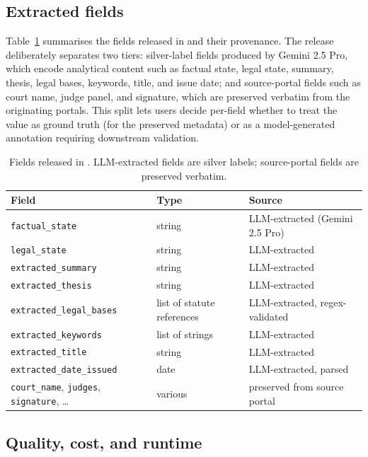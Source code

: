 \subsection{Extracted fields}
\label{sec:pipeline:fields}

Table~\ref{tab:fields} summarises the fields released in \juddgespl{} and their provenance. The release deliberately separates two tiers: silver-label fields produced by Gemini 2.5 Pro, which encode analytical content such as factual state, legal state, summary, thesis, legal bases, keywords, title, and issue date; and source-portal fields such as court name, judge panel, and signature, which are preserved verbatim from the originating portals. This split lets users decide per-field whether to treat the value as ground truth (for the preserved metadata) or as a model-generated annotation requiring downstream validation.

\begin{table}[h]
\centering
\small
\begin{tabular}{lll}
\toprule
\textbf{Field} & \textbf{Type} & \textbf{Source} \\
\midrule
\texttt{factual\_state} & string & LLM-extracted (Gemini 2.5 Pro) \\
\texttt{legal\_state} & string & LLM-extracted \\
\texttt{extracted\_summary} & string & LLM-extracted \\
\texttt{extracted\_thesis} & string & LLM-extracted \\
\texttt{extracted\_legal\_bases} & list of statute references & LLM-extracted, regex-validated \\
\texttt{extracted\_keywords} & list of strings & LLM-extracted \\
\texttt{extracted\_title} & string & LLM-extracted \\
\texttt{extracted\_date\_issued} & date & LLM-extracted, parsed \\
\texttt{court\_name}, \texttt{judges}, \texttt{signature}, \dots & various & preserved from source portal \\
\bottomrule
\end{tabular}
\caption{Fields released in \juddgespl{}. LLM-extracted fields are silver labels; source-portal fields are preserved verbatim.}
\label{tab:fields}
\end{table}

\subsection{Quality, cost, and runtime}
\label{sec:pipeline:quality}

